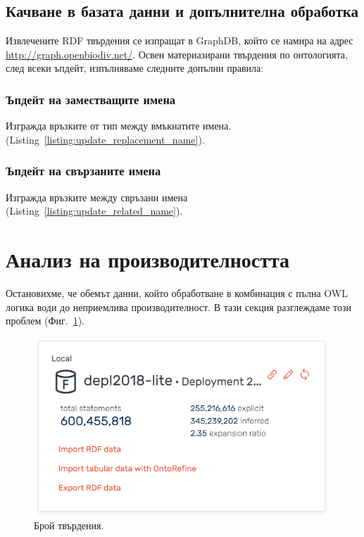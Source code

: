 \subsection{Качване в базата данни и допълнителна обработка}

Извлечените RDF твърдения се изпращат в GraphDB, който се намира на адрес \url{http://graph.openbiodiv.net/}. Освен материазирани твърдения по онтологията, след всеки ъпдейт, изпълняваме следните допълни правила: 

\subsubsection{Ъпдейт на заместващите имена}

Изгражда връзките от тип  между вмъкнатите имена.
(Listing~\ref{listing:update_replacement_name}).



\subsubsection{Ъпдейт на свързаните имена}

Изгражда връзките между свръзани имена (Listing~\ref{listing:update_related_name}).



\section{Анализ на производителността}

Остановихме, че обемът данни, който обработване в комбинация с пълна OWL логика води до неприемлива производителност. В тази секция разглеждаме този проблем (Фиг.~\ref{fig:statements-report}).

\begin{figure}
\centering
\includegraphics[width=\textwidth]{Figures/active-repository}
\decoRule
\caption[Statements report]{Брой твърдения.}
\label{fig:statements-report}
\end{figure}

